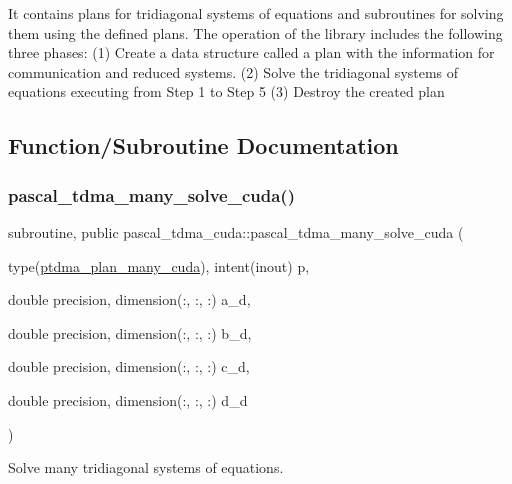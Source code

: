 It contains plans for tridiagonal systems of equations and subroutines for solving them using the defined plans. The operation of the library includes the following three phases\+: (1) Create a data structure called a plan with the information for communication and reduced systems. (2) Solve the tridiagonal systems of equations executing from Step 1 to Step 5 (3) Destroy the created plan 

\subsection{Function/\+Subroutine Documentation}
\mbox{\label{namespacepascal__tdma__cuda_a0043d538e133925d9a37bf7bcdaf4b08}} 
\subsubsection{\texorpdfstring{pascal\+\_\+tdma\+\_\+many\+\_\+solve\+\_\+cuda()}{pascal\_tdma\_many\_solve\_cuda()}}
{\footnotesize\ttfamily subroutine, public pascal\+\_\+tdma\+\_\+cuda\+::pascal\+\_\+tdma\+\_\+many\+\_\+solve\+\_\+cuda (\begin{DoxyParamCaption}\item[{type(\hyperlink{structpascal__tdma__cuda_1_1ptdma__plan__many__cuda}{ptdma\+\_\+plan\+\_\+many\+\_\+cuda}), intent(inout)}]{p,  }\item[{double precision, dimension(\+:, \+:, \+:)}]{a\+\_\+d,  }\item[{double precision, dimension(\+:, \+:, \+:)}]{b\+\_\+d,  }\item[{double precision, dimension(\+:, \+:, \+:)}]{c\+\_\+d,  }\item[{double precision, dimension(\+:, \+:, \+:)}]{d\+\_\+d }\end{DoxyParamCaption})}



Solve many tridiagonal systems of equations. 



